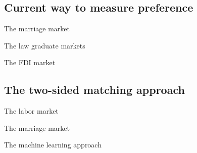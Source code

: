 \subsection{Current way to measure preference}

The marriage market

The law graduate markets

The FDI market

\subsection{The two-sided matching approach}

The labor market

The marriage market

The machine learning approach